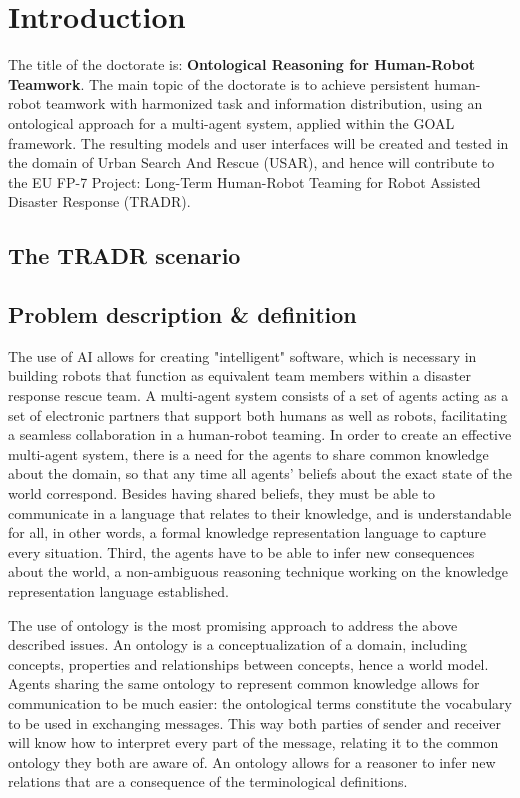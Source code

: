 \section{Introduction}
The title of the doctorate is: \textbf{Ontological Reasoning for Human-Robot Teamwork}.
The main topic of the doctorate is to achieve persistent human-robot teamwork with harmonized task and information distribution, using an ontological approach for a multi-agent system, applied within the GOAL framework. The resulting models and user interfaces will be created and tested in the domain of Urban Search And Rescue (USAR), and hence will contribute to the EU FP-7 Project: Long-Term Human-Robot Teaming for Robot Assisted Disaster Response (TRADR).




\subsection{The TRADR scenario}

\subsection{Problem description & definition}

The use of AI allows for creating "intelligent" software, which is necessary in building robots that function as equivalent team members within a disaster response rescue team. A multi-agent system consists of a set of agents acting as a set of electronic partners that support both humans as well as robots, facilitating a seamless collaboration in a human-robot teaming. In order to create an effective multi-agent system, there is a need for the agents to share common knowledge about the domain, so that any time all agents' beliefs about the exact state of the world correspond. Besides having shared
beliefs, they must be able to communicate in a language that relates to their knowledge, and is understandable for all, in other words, a formal knowledge representation language to capture every situation. Third, the agents have to be able to infer new consequences about the world, a non-ambiguous reasoning technique working on the knowledge representation language established.

The use of ontology is the most promising approach to address the above described issues. An ontology is a conceptualization of a domain, including concepts, properties and relationships between concepts, hence a world model. Agents sharing the same ontology to represent common knowledge allows for communication to be much easier: the ontological terms constitute
the vocabulary to be used in exchanging messages. This way both parties of sender and receiver will know how to interpret every part of the message, relating it to the common ontology they both are aware of. An ontology
allows for a reasoner to infer new relations that are a consequence of the terminological definitions.

